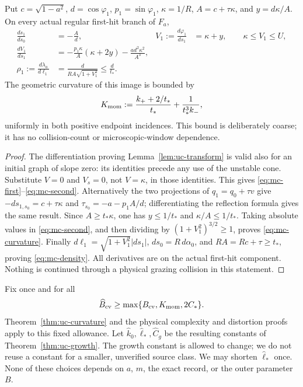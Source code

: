\begin{lemma}
\label{lem:mc-first}
Put $c=\sqrt{1-a^2}$, $d=\cos\varphi_1$, $p_1=\sin\varphi_1$,
$\kappa=1/R$, $A=c+\tau\kappa$, and $y=d\kappa/A$.
On every actual regular first-hit branch of $F_a$,
\begin{align}
 \frac{ds_1}{ds_0}&=-\frac A d,&
 V_1:=\frac{d\varphi_1}{ds_1}&=\kappa+y,
       \qquad \kappa\le V_1\le U,\label{eq:mc-first}\\
 \frac{dV_1}{ds_1}
   &=-\frac{p_1\kappa}{A}(\kappa+2y)
          -\frac{a d^2\kappa^2}{A^3},\label{eq:mc-second}\\
 \rho_1:=\frac{d\lambda_a}{d\ell_1}
   &=\frac d{R A\sqrt{1+V_1^2}}\le\frac d{t_*}.
                                                        \label{eq:mc-density}
\end{align}
The geometric curvature of this image is bounded by
\begin{equation}\label{eq:mc-curvature}
 K_{\rm mom}:=\frac{k_++2/t_*}{t_*}
                  +\frac1{t_*^3 k_-},
\end{equation}
uniformly in both positive endpoint incidences. This bound is deliberately
coarse; it has no collision-count or microscopic-window dependence.
\end{lemma}
\begin{proof}
The differentiation proving Lemma~\ref{lem:uc-transform} is valid also
for an initial graph of slope zero: its identities precede any use of the
unstable cone. Substitute $V=0$ and $V_s=0$, not $V=\kappa$, in those
identities. This gives \eqref{eq:mc-first}--\eqref{eq:mc-second}.
Alternatively the two projections of $q_1=q_0+\tau v$ give
$-d s_{1,s_0}=c+\tau\kappa$ and
$\tau_{s_0}=-a-p_1A/d$; differentiating the reflection formula gives
the same result. Since $A\ge t_*\kappa$, one has
$y\le1/t_*$ and $\kappa/A\le1/t_*$. Taking absolute values in
\eqref{eq:mc-second}, and then dividing by
$(1+V_1^2)^{3/2}\ge1$, proves \eqref{eq:mc-curvature}.
Finally $d\ell_1=\sqrt{1+V_1^2}|ds_1|$, $ds_0=R\,d\alpha_0$,
and $RA=Rc+\tau\ge t_*$, proving \eqref{eq:mc-density}.
All derivatives are on the actual first-hit component. Nothing is
continued through a physical grazing collision in this statement.
\end{proof}

Fix once and for all
\begin{equation}\label{eq:mc-class}
 \widehat B_{\rm cv}\ge\max\{B_{\rm cv},K_{\rm mom},2C_*\}.
\end{equation}
Theorem~\ref{thm:uc-curvature} and the physical complexity and distortion
proofs apply to this fixed allowance. Let
$\widehat k_0,\widehat\ell_*,\widehat C_g$ be the resulting constants
of Theorem~\ref{thm:uc-growth}. The growth constant is allowed to change;
we do not reuse a constant for a smaller, unverified source class.
We may shorten $\widehat\ell_*$ once. None of these choices depends on
$a$, $m$, the exact record, or the outer parameter $B$.


